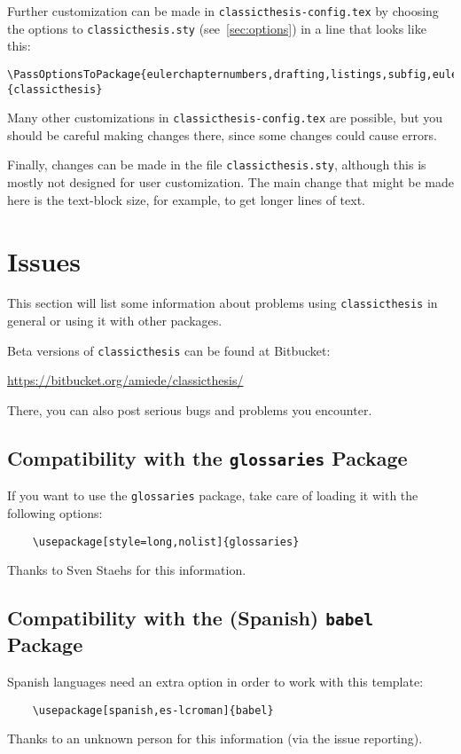 Further customization can be made in \texttt{classicthesis-config.tex}
by choosing the options to \texttt{classicthesis.sty} 
(see~\autoref{sec:options}) in a line that looks like this:

\begin{lstlisting}[frame=lt]
\PassOptionsToPackage{eulerchapternumbers,drafting,listings,subfig,eulermath,parts}{classicthesis}
\end{lstlisting}

Many other customizations in \texttt{classicthesis-config.tex} are
possible, but you should be careful making changes there, since some
changes could cause errors.

Finally, changes can be made in the file \texttt{classicthesis.sty},%
 although this is mostly not designed for user customization. The
main change that might be made here is the text-block size, for example,
to get longer lines of text.


\section{Issues}\label{sec:issues}
This section will list some information about problems using
\texttt{classic\-thesis} in general or using it with other packages.

Beta versions of \texttt{classicthesis} can be found at Bitbucket:
\begin{center}
    \url{https://bitbucket.org/amiede/classicthesis/}
\end{center}
There, you can also post serious bugs and problems you encounter.

\subsection*{Compatibility with the \texttt{glossaries} Package}
If you want to use the \texttt{glossaries} package, take care of loading it 
with the following options:
\begin{verbatim}
    \usepackage[style=long,nolist]{glossaries}
\end{verbatim}
Thanks to Sven Staehs for this information. 


\subsection*{Compatibility with the (Spanish) \texttt{babel} Package}
Spanish languages need an extra option in order to work with this template:
\begin{verbatim}
    \usepackage[spanish,es-lcroman]{babel}
\end{verbatim}
Thanks to an unknown person for this information (via the issue reporting). 



